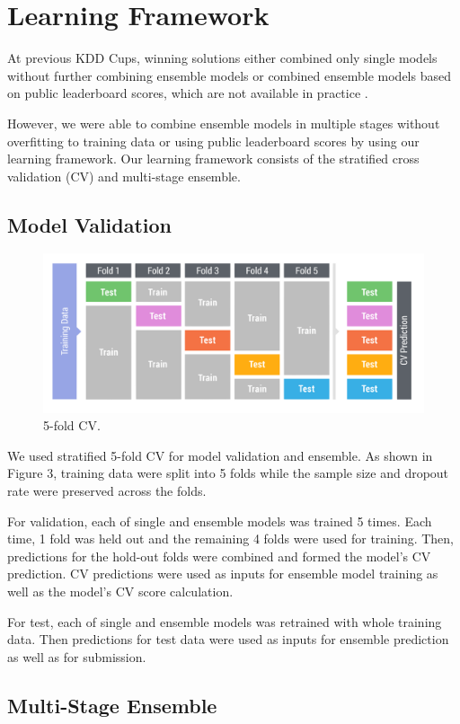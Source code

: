 \section{Learning Framework}
At previous KDD Cups, winning solutions either combined only single models without further combining ensemble models \cite{guyon2009analysis, yu2010feature, jahrer2012ensemble} or combined ensemble models based on public leaderboard scores, which are not available in practice \cite{chen2011, wu2012two}.

However, we were able to combine ensemble models in multiple stages without overfitting to training data or using public leaderboard scores by using our learning framework.  Our learning framework consists of the stratified cross validation (CV) and multi-stage ensemble.

\subsection{Model Validation}

\begin{figure}
  \centering
    \includegraphics[width=0.5 \textwidth]{cv}
    \caption{5-fold CV.}
\end{figure}

We used stratified 5-fold CV for model validation and ensemble.
As shown in Figure 3, training data were split into 5 folds while the sample size and dropout rate were preserved across the folds.

For validation, each of single and ensemble models was trained 5 times. Each time, 1 fold was held out and the remaining 4 folds were used for training. Then, predictions for the hold-out folds were combined and formed the model's CV prediction. CV predictions were used as inputs for ensemble model training as well as the model's CV score calculation.

For test, each of single and ensemble models was retrained with whole training data. Then predictions for test data were used as inputs for ensemble prediction as well as for submission. 

\subsection{Multi-Stage Ensemble}

